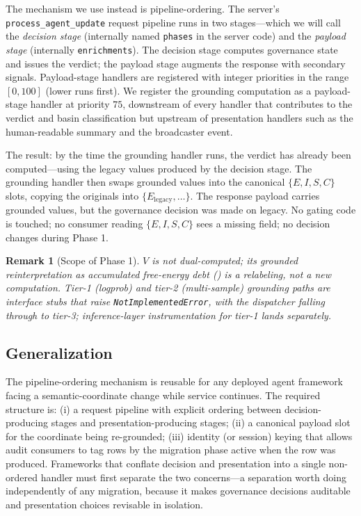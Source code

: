 \documentclass[11pt,twocolumn]{article}
\newtheorem{remark}[theorem]{Remark}
\begin{document}
The mechanism we use instead is pipeline-ordering. The server's
\texttt{process\_agent\_update} request pipeline runs in two
stages---which we will call the \emph{decision stage} (internally
named \texttt{phases} in the server code) and the \emph{payload
stage} (internally \texttt{enrichments}). The decision stage
computes governance state and issues the verdict; the payload
stage augments the response with secondary signals. Payload-stage
handlers are registered with integer priorities in the range
$[0, 100]$ (lower runs first). We register the grounding
computation as a payload-stage handler at priority $75$,
downstream of every handler that contributes to the verdict and
basin classification but upstream of presentation handlers such as
the human-readable summary and the broadcaster event.

The result: by the time the grounding handler runs, the verdict
has already been computed---using the legacy values produced by
the decision stage. The grounding handler then swaps grounded
values into the canonical
$\{E, I, S, C\}$ slots, copying the originals into
$\{E_{\text{legacy}}, \dots\}$. The response payload carries
grounded values, but the governance decision was made on legacy.
No gating code is touched; no consumer reading
$\{E, I, S, C\}$ sees a missing field; no decision changes during
Phase 1.

\begin{remark}[Scope of Phase 1]
$V$ is not dual-computed; its grounded reinterpretation as
accumulated free-energy debt () is a
relabeling, not a new computation. Tier-1 (logprob) and tier-2
(multi-sample) grounding paths are interface stubs that raise
\texttt{NotImplementedError}, with the dispatcher falling through
to tier-3; inference-layer instrumentation for tier-1 lands
separately.
\end{remark}

\subsection{Generalization}

The pipeline-ordering mechanism is reusable for any deployed
agent framework facing a semantic-coordinate change while service
continues. The required structure is: (i) a request pipeline with
explicit ordering between decision-producing stages and
presentation-producing stages; (ii) a canonical payload slot for
the coordinate being re-grounded; (iii) identity (or session)
keying that allows audit consumers to tag rows by the migration
phase active when the row was produced.
Frameworks that conflate decision and presentation into a single
non-ordered handler must first separate the two concerns---a
separation worth doing independently of any migration, because it
makes governance decisions auditable and presentation choices
revisable in isolation.
\end{document}

